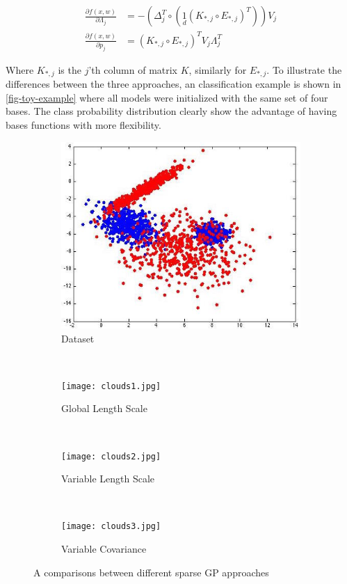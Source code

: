 \documentclass[useAMS,usenatbib,fleqn]{mn2e}
\begin{document}
\begin{subequations}
\begin{align} 
\label{eq-dfdL}
\frac{\partial f(x,w)}{\partial \Lambda_{j}} &= -\left( \Delta_{j}^{T}\circ \left(\underset{d}{1}\left(K_{*,j}\circ E_{*,j}\right)^{T}\right) \right)V_{j}\\
\label{eq-dfdP}
\frac{\partial f(x,w)}{\partial p_{j}} &= \left( K_{*,j}\circ E_{*,j} \right)^{T}V_{j}\Lambda_{j}^{T}
\end{align}
\end{subequations}

Where $K_{*,j}$ is the $j$'th column of matrix $K$, similarly for $E_{*,j}$. To illustrate the differences between the three approaches, an classification example is shown in \ref{fig-toy-example} where all models were initialized with the same set of four bases. The class probability distribution clearly show the advantage of having bases functions with more flexibility. 

\begin{figure}
        \centering
        \begin{subfigure}[b]{110 px}
                \includegraphics[width=\textwidth]{clouds.jpg}
                \caption{Dataset}
                \label{fig:dataset}
        \end{subfigure}
        ~
        \begin{subfigure}[b]{110 px}
                \texttt{[image: clouds1.jpg]}
                \caption{Global Length Scale}
                \label{fig:global}
        \end{subfigure}
        ~
        \begin{subfigure}[b]{110 px}
                \texttt{[image: clouds2.jpg]}
                \caption{Variable Length Scale}
                \label{fig:variable-lambda}
        \end{subfigure}
        ~
        \begin{subfigure}[b]{110 px}
                \texttt{[image: clouds3.jpg]}
                \caption{Variable Covariance}
                \label{fig:variable-covariance}
        \end{subfigure}
        \caption{A comparisons between different sparse GP approaches}
        \label{toy-example}
\end{figure}
\end{document}
